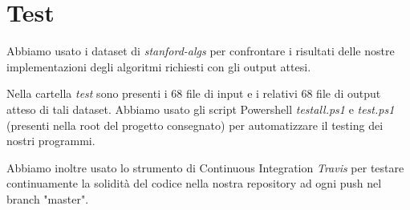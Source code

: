 \section{Test}
\label{cap:tests}

Abbiamo usato i dataset di \textit{stanford-algs} per confrontare i risultati delle nostre implementazioni degli algoritmi richiesti con gli output attesi.

\noindent Nella cartella \textit{test} sono presenti i 68 file di input e i relativi 68 file di output atteso di tali dataset. Abbiamo usato gli script Powershell \textit{testall.ps1} e \textit{test.ps1} (presenti nella root del progetto consegnato) per automatizzare il testing dei nostri programmi.

\noindent Abbiamo inoltre usato lo strumento di Continuous Integration \textit{Travis} per testare continuamente la solidità del codice nella nostra repository ad ogni push nel branch "master".
